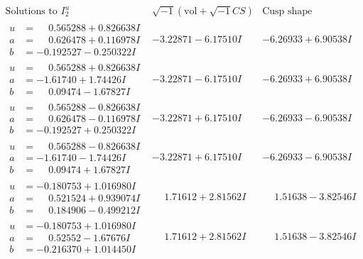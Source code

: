 \documentclass[1p]{elsarticle_modified}
\theoremstyle{definition}
\newcommand{\I}{\sqrt{-1}}
\begin{document}
$$\begin{array}{c|c|c}  
\text{Solutions to }I^u_{2}& \I (\text{vol} + \sqrt{-1}CS) & \text{Cusp shape}\\
 \hline 
\begin{aligned}
u &= \phantom{-}0.565288 + 0.826638 I \\
a &= \phantom{-}0.626478 + 0.116978 I \\
b &= -0.192527 - 0.250322 I\end{aligned}
 & -3.22871 - 6.17510 I & -6.26933 + 6.90538 I \\ \hline\begin{aligned}
u &= \phantom{-}0.565288 + 0.826638 I \\
a &= -1.61740 + 1.74426 I \\
b &= \phantom{-}0.09474 - 1.67827 I\end{aligned}
 & -3.22871 - 6.17510 I & -6.26933 + 6.90538 I \\ \hline\begin{aligned}
u &= \phantom{-}0.565288 - 0.826638 I \\
a &= \phantom{-}0.626478 - 0.116978 I \\
b &= -0.192527 + 0.250322 I\end{aligned}
 & -3.22871 + 6.17510 I & -6.26933 - 6.90538 I \\ \hline\begin{aligned}
u &= \phantom{-}0.565288 - 0.826638 I \\
a &= -1.61740 - 1.74426 I \\
b &= \phantom{-}0.09474 + 1.67827 I\end{aligned}
 & -3.22871 + 6.17510 I & -6.26933 - 6.90538 I \\ \hline\begin{aligned}
u &= -0.180753 + 1.016980 I \\
a &= \phantom{-}0.521524 + 0.939074 I \\
b &= \phantom{-}0.184906 - 0.499212 I\end{aligned}
 & \phantom{-}1.71612 + 2.81562 I & \phantom{-}1.51638 - 3.82546 I \\ \hline\begin{aligned}
u &= -0.180753 + 1.016980 I \\
a &= \phantom{-}0.52552 - 1.67676 I \\
b &= -0.216370 + 1.014450 I\end{aligned}
 & \phantom{-}1.71612 + 2.81562 I & \phantom{-}1.51638 - 3.82546 I \\ \hline\begin{aligned}

\end{aligned}
\end{array}$$
\end{document}
